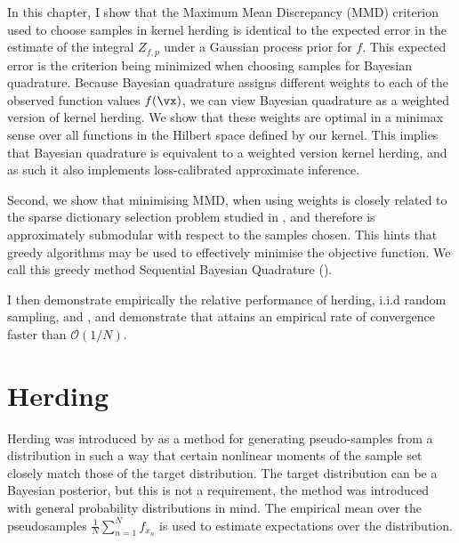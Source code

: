 In this chapter, I show that the Maximum Mean Discrepancy (MMD) criterion used to choose samples in kernel herding is identical to the expected error in the estimate of the integral $Z_{f,p}$ under a Gaussian process prior for $f$. This expected error is the criterion being minimized when choosing samples for Bayesian quadrature. Because Bayesian quadrature assigns different weights to each of the observed function values $f(\vx)$, we can view Bayesian quadrature as a weighted version of kernel herding. We show that these weights are optimal in a minimax sense over all functions in the Hilbert space defined by our kernel. This implies that Bayesian quadrature is equivalent to a weighted version kernel herding, and as such it also implements loss-calibrated approximate inference.

Second, we show that minimising MMD, when using \bq{} weights is closely related to the sparse dictionary selection problem studied in \citep{KrauseCevher10}, and therefore is approximately submodular with respect to the samples chosen. This hints that greedy algorithms may be used to effectively minimise the objective function. We call this greedy method Sequential Bayesian Quadrature (\sbq{}).

I then demonstrate empirically the relative performance of herding, i.i.d random sampling, and \sbq{}, and demonstrate that \sbq{} attains an empirical rate of convergence faster than $\mathcal{O}(1/N)$.


\section{Herding} 

Herding was introduced by \citep{welling2009herding} as a method for generating pseudo-samples from a distribution in such a way that certain nonlinear moments of the sample set closely match those of the target distribution. The target distribution can be a Bayesian posterior, but this is not a requirement, the method was introduced with general probability distributions in mind. The empirical mean over the pseudosamples $\frac{1}{N}\sum_{n=1}^{N}f_{x_n}$ is used to estimate expectations over the distribution.


